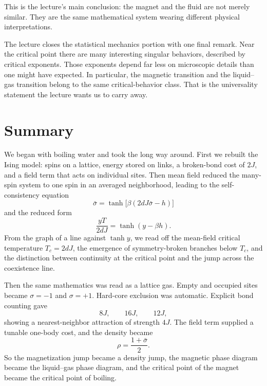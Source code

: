 This is the lecture's main conclusion: the magnet and the fluid are not merely similar. They are the same mathematical system wearing different physical interpretations.

The lecture closes the statistical mechanics portion with one final remark. Near the critical point there are many interesting singular behaviors, described by critical exponents. Those exponents depend far less on microscopic details than one might have expected. In particular, the magnetic transition and the liquid--gas transition belong to the same critical-behavior class. That is the universality statement the lecture wants us to carry away.

\section{Summary}

We began with boiling water and took the long way around. First we rebuilt the Ising model: spins on a lattice, energy stored on links, a broken-bond cost of \(2J\), and a field term that acts on individual sites. Then mean field reduced the many-spin system to one spin in an averaged neighborhood, leading to the self-consistency equation
\[
\bar{\sigma}=\tanh\!\big[\beta(2dJ\bar{\sigma}-h)\big]
\]
and the reduced form
\[
\frac{yT}{2dJ}=\tanh(y-\beta h).
\]
From the graph of a line against \(\tanh y\), we read off the mean-field critical temperature \(T_c=2dJ\), the emergence of symmetry-broken branches below \(T_c\), and the distinction between continuity at the critical point and the jump across the coexistence line.

Then the same mathematics was read as a lattice gas. Empty and occupied sites became \(\sigma=-1\) and \(\sigma=+1\). Hard-core exclusion was automatic. Explicit bond counting gave
\[
8J,\qquad 16J,\qquad 12J,
\]
showing a nearest-neighbor attraction of strength \(4J\). The field term supplied a tunable one-body cost, and the density became
\[
\rho=\frac{1+\bar{\sigma}}{2}.
\]
So the magnetization jump became a density jump, the magnetic phase diagram became the liquid--gas phase diagram, and the critical point of the magnet became the critical point of boiling.